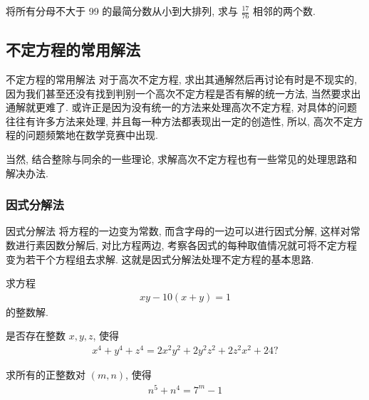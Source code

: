 \documentclass[aspectratio=169]{ctexbeamer}
\theoremstyle{definition}
\begin{document}
\begin{frame}[t]
	\begin{example}
		将所有分母不大于 99 的最简分数从小到大排列, 求与 $\frac{17}{76}$ 相邻的两个数.
	\end{example}
\end{frame}

\subsection{不定方程的常用解法}
\begin{frame}{不定方程的常用解法}
	对于高次不定方程, 求出其通解然后再讨论有时是不现实的, 因为我们甚至还没有找到判别一个高次不定方程是否有解的统一方法, 当然要求出通解就更难了. 或许正是因为没有统一的方法来处理高次不定方程, 对具体的问题往往有许多方法来处理, 并且每一种方法都表现出一定的创造性, 所以, 高次不定方程的问题频繁地在数学竞赛中出现.

	当然, 结合整除与同余的一些理论, 求解高次不定方程也有一些常见的处理思路和解决办法.
\end{frame}


\subsubsection*{因式分解法}
\begin{frame}{因式分解法}
将方程的一边变为常数, 而含字母的一边可以进行因式分解, 这样对常数进行素因数分解后, 对比方程两边, 考察各因式的每种取值情况就可将不定方程变为若干个方程组去求解. 这就是因式分解法处理不定方程的基本思路.
\end{frame}
\begin{frame}[t]
	\begin{example}
		求方程
		\begin{align*}
			x y-10(x+y)=1
		\end{align*}
		的整数解.
	\end{example}
\end{frame}

\begin{frame}[t]
	\begin{example}
		是否存在整数 $x ,  y ,  z$, 使得
		\begin{align*}
			x^{4}+y^{4}+z^{4}=2 x^{2} y^{2}+2 y^{2} z^{2}+2 z^{2} x^{2}+24 ?
		\end{align*}
	\end{example}
\end{frame}

\begin{frame}[t]
	\begin{example}
		求所有的正整数对 $(m, n)$, 使得
		\begin{align*}
			n^{5}+n^{4}=7^{m}-1
		\end{align*}
	\end{example}
\end{frame}
\end{document}
